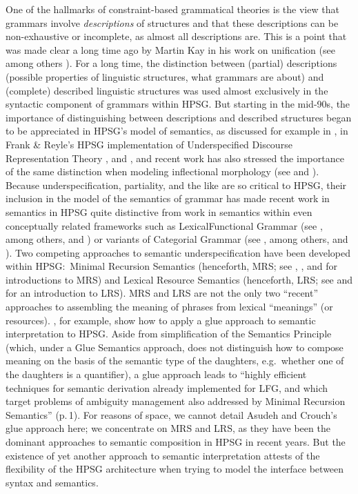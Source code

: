 \documentclass[output=paper
 	        ,biblatex
                ,babelshorthands
                ,newtxmath
                ,draftmode
                ,colorlinks, citecolor=brown
]{langscibook}
\begin{document}
One of the hallmarks of constraint-based grammatical theories is the view that grammars involve
\emph{descriptions} of structures and that these descriptions can be non-exhaustive or incomplete,
as almost all descriptions are. This is a point that was made clear a long time ago by Martin Kay
in his work on unification (see among others \citealt{Kay1979}). For a long time, the distinction
between (partial) descriptions (possible properties of linguistic structures, what grammars are
about) and (complete) described linguistic structures was used almost exclusively in the syntactic
component of grammars within HPSG. But starting in the mid-90s, the importance of distinguishing
between descriptions and described structures began to be appreciated in HPSG's model of semantics,
as discussed for example in \citet{Nerbonne1993a}, in Frank \& Reyle's HPSG implementation of
Underspecified Discourse Representation Theory \citep{FrankandReyle1992,FrankandReyle1995}, and
\citet*{Copestakeetal1995}, and recent work has also stressed the importance of the same distinction
when modeling inflectional morphology (see \citealt{CrysmannandBonami2016} and
). Because underspecification,
partiality, and the like are so critical to HPSG, their inclusion in the model of the semantics of
grammar has made recent work in semantics in HPSG quite distinctive from work in semantics within
even conceptually related frameworks such as Lexical\indexlfg Functional Grammar (see
\citealt{BK82a}, among others, and ) or variants of Categorial\indexcg
Grammar (see \citealt{Steedman1996}, among others, and ). Two competing
approaches to semantic underspecification have been developed within HPSG:\ Minimal Recursion
Semantics (henceforth, MRS; see \citealt{Copestakeetal1995}, \citealt{Copestakeetal2001}, and
\citealt{Copestakeetal2005} for introductions to MRS) and Lexical Resource Semantics (henceforth,
LRS; see \citealt{RichterandSailer2004,RichterandSailer2001} and
\citealt{IordachioaiaandRichter2015} for an introduction to LRS). MRS and LRS are not the only two
``recent'' approaches to assembling the meaning of phrases from lexical ``meanings'' (or
resources). \citet{AsudehandCrouch2002}, for example, show how to apply a glue approach to semantic
interpretation to HPSG. Aside from simplification of the Semantics Principle (which, under a Glue
Semantics approach, does not distinguish how to compose meaning on the basis of the semantic type of
the daughters, e.g.\ whether one of the daughters is a quantifier), a glue approach leads to
``highly efficient techniques for semantic derivation already implemented for LFG, and which target
problems of ambiguity management also addressed by Minimal Recursion Semantics'' (p.\,1). For
reasons of space, we cannot detail Asudeh and Crouch's glue approach here; we concentrate on MRS and
LRS, as they have been the dominant approaches to semantic composition in HPSG in recent years. But
the existence of yet another approach to semantic interpretation attests of the flexibility of the
HPSG architecture when trying to model the interface between syntax and semantics.
\end{document}
